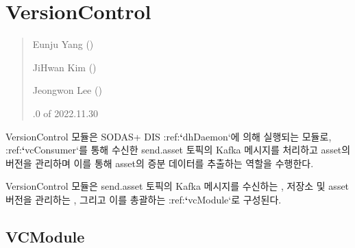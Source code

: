 \documentclass[a4paper,10pt,english]{sphinxmanual}
\begin{document}
\sphinxstepscope


\chapter{VersionControl}
\label{\detokenize{VersionControl:versioncontrol}}\label{\detokenize{VersionControl:versioncontrolmodule}}\label{\detokenize{VersionControl::doc}}\begin{quote}\begin{description}
\begin{DUlineblock}{0em}
\item[] Eunju Yang ()
\item[] Ji\sphinxhyphen{}Hwan Kim ()
\item[] Jeongwon Lee ()
\end{DUlineblock}

.0 of 2022.11.30

\end{description}\end{quote}

\sphinxAtStartPar
VersionControl 모듈은 SODAS+ DIS :ref:{\color{red}\bfseries{}`}dhDaemon`에 의해 실행되는 모듈로, :ref:{\color{red}\bfseries{}`}vcConsumer`를 통해 수신한 send.asset 토픽의 Kafka 메시지를 처리하고 asset의 버전을 관리하며 이를 통해 asset의 증분 데이터를 추출하는 역할을 수행한다.

\sphinxAtStartPar
VersionControl 모듈은 send.asset 토픽의 Kafka 메시지를 수신하는 {\hyperref[\detokenize{_VCConsumer:vcconsumer}]{}}, 저장소 및 asset 버전을 관리하는 {\hyperref[\detokenize{_VersionController:versioncontroller}]{}}, 그리고 이를 총괄하는 :ref:{\color{red}\bfseries{}`}vcModule`로 구성된다.

\begin{DUlineblock}{0em}
\item[] 
\end{DUlineblock}

\sphinxstepscope


\section{VCModule}
\label{\detokenize{_VCModule:vcmodule}}\label{\detokenize{_VCModule:id1}}\label{\detokenize{_VCModule::doc}}
\end{document}
